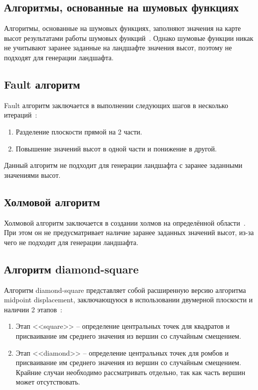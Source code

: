\subsection{Алгоритмы, основанные на шумовых функциях}

Алгоритмы, основанные на шумовых функциях, заполняют значения на карте высот результатами работы шумовых функций~\cite{noises}. Однако шумовые функции никак не учитывают заранее заданные на ландшафте значения высот, поэтому не подходят для генерации ландшафта.

\subsection{Fault алгоритм}

Fault алгоритм заключается в выполнении следующих шагов в несколько итераций~\cite{nohabrinsource}:

\begin{enumerate}[label=\arabic*.]
	\item Разделение плоскости прямой на 2 части.
	\item Повышение значений высот в одной части и понижение в другой.
\end{enumerate}

Данный алгоритм не подходит для генерации ландшафта с заранее заданными значениями высот.

\subsection{Холмовой алгоритм}

Холмовой алгоритм заключается в создании холмов на определённой области~\cite{usages}. При этом он не предусматривает наличие заранее заданных значений высот, из-за чего не подходит для генерации ландшафта.

\subsection{Алгоритм diamond-square}

Алгоритм diamond-square представляет собой расширенную версию алгоритма midpoint displacement, заключающуюся в использовании двумерной плоскости и наличии 2 этапов~\cite{ds}:

\begin{enumerate}[label=\arabic*.]
	\item Этап <<square>> -- определение центральных точек для квадратов и присваивание им среднего значения из вершин со случайным смещением.
	\item Этап <<diamond>> -- определение центральных точек для ромбов и присваивание им среднего значения из вершин со случайным смещением. Крайние случаи необходимо рассматривать отдельно, так как часть вершин может отсутствовать.
\end{enumerate}

